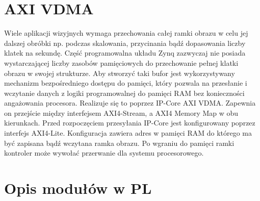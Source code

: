 \section{AXI VDMA}
Wiele aplikacji wizyjnych wymaga przechowania całej ramki obrazu w celu jej dalszej obróbki np. podczas skalowania, przycinania bądź dopasowania liczby klatek na sekundę. 
Część programowalna układu Zynq zazwyczaj nie posiada wystarczającej liczby zasobów pamięciowych do przechowanie pełnej klatki obrazu w swojej strukturze. 
Aby stworzyć taki bufor jest wykorzystywany mechanizm bezpośredniego dostępu do pamięci, który pozwala na przesłanie i wczytanie danych z logiki programowalnej do pamięci RAM bez konieczności angażowania procesora. 
Realizuje się to poprzez IP-Core AXI VDMA. 
Zapewnia on przejście między interfejsem AXI4-Stream, a AXI4 Memory Map w obu kierunkach. 
Przed rozpoczęciem przesyłania IP-Core jest konfigurowany poprzez interfejs AXI4-Lite. 
Konfiguracja zawiera adres w pamięci RAM do którego ma być zapisana bądź wczytana ramka obrazu. 
Po wgraniu do pamięci ramki kontroler może wywołać przerwanie dla systemu procesorowego.
\section{Opis modułów w PL}
